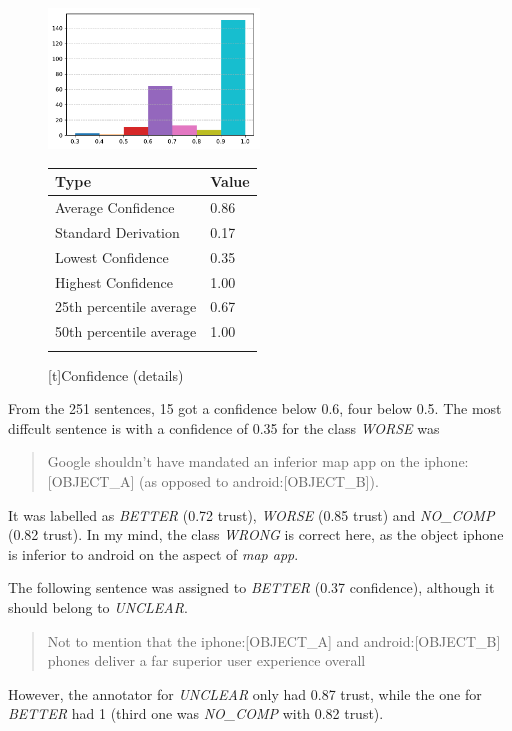 \begin{figure}
\parbox[b]{0.48\textwidth}{\null
  \centering

\includegraphics[width=0.5\textwidth]{images/prestudy/confidence.pdf}
\label{pre:dist}
}
\parbox[b]{0.48\textwidth}{\null
\centering

\begin{tabular}{@{}ll@{}}
\toprule
Type & Value  \\ \midrule
Average Confidence & 0.86 \\
Standard Derivation & 0.17 \\
Lowest Confidence & 0.35\\
Highest Confidence & 1.00\\
25th percentile average & 0.67\\
50th percentile average & 1.00\\
\bottomrule
\label{pre:conf-table}
\end{tabular}
    [t]{Confidence (details)}%
}
\end{figure}

From the 251 sentences, 15 got a confidence below 0.6, four below 0.5. The most diffcult sentence is with a confidence of 0.35 for the class \emph{WORSE} was
\begin{quote}
Google shouldn't have mandated an inferior map app on the iphone:[OBJECT\_A] (as opposed to android:[OBJECT\_B]).
\end{quote}

It was labelled as \emph{BETTER} (0.72 trust), \emph{WORSE} (0.85 trust) and \emph{NO\_COMP} (0.82 trust). In my mind, the class \emph{WRONG} is correct here, as the object iphone is inferior to android on the aspect of \emph{map app}.

The following sentence was assigned to \emph{BETTER} (0.37 confidence), although it should belong to \emph{UNCLEAR}.
\begin{quote}
Not to mention that the iphone:[OBJECT\_A] and android:[OBJECT\_B] phones deliver a far superior user experience overall
\end{quote}
However, the annotator for \emph{UNCLEAR} only had 0.87 trust, while the one for \emph{BETTER} had 1 (third one was \emph{NO\_COMP} with 0.82 trust).\newline

